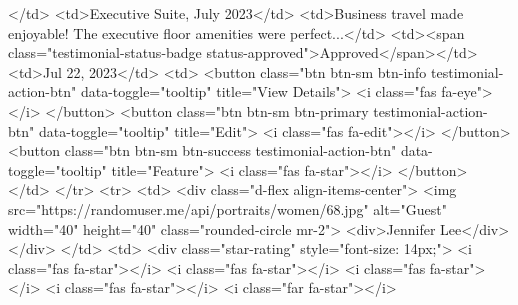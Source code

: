                                                 </td>
                                                <td>Executive Suite, July 2023</td>
                                                <td>Business travel made enjoyable! The executive floor amenities were perfect...</td>
                                                <td><span class="testimonial-status-badge status-approved">Approved</span></td>
                                                <td>Jul 22, 2023</td>
                                                <td>
                                                    <button class="btn btn-sm btn-info testimonial-action-btn" data-toggle="tooltip" title="View Details">
                                                        <i class="fas fa-eye"></i>
                                                    </button>
                                                    <button class="btn btn-sm btn-primary testimonial-action-btn" data-toggle="tooltip" title="Edit">
                                                        <i class="fas fa-edit"></i>
                                                    </button>
                                                    <button class="btn btn-sm btn-success testimonial-action-btn" data-toggle="tooltip" title="Feature">
                                                        <i class="fas fa-star"></i>
                                                    </button>
                                                </td>
                                            </tr>
                                            <tr>
                                                <td>
                                                    <div class="d-flex align-items-center">
                                                        <img src="https://randomuser.me/api/portraits/women/68.jpg" alt="Guest" width="40" height="40" class="rounded-circle mr-2">
                                                        <div>Jennifer Lee</div>
                                                    </div>
                                                </td>
                                                <td>
                                                    <div class="star-rating" style="font-size: 14px;">
                                                        <i class="fas fa-star"></i>
                                                        <i class="fas fa-star"></i>
                                                        <i class="fas fa-star"></i>
                                                        <i class="fas fa-star"></i>
                                                        <i class="far fa-star"></i>

